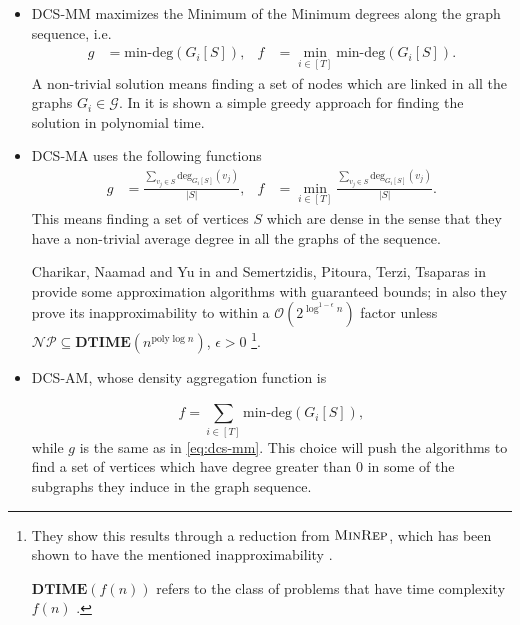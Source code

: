 \begin{itemize}
	\item \acrshort{DCS}-MM maximizes the Minimum of the Minimum degrees along
	      the graph sequence, i.e.
	      \begin{align}
		      \label{eq:dcs-mm}
		      g & = \text{min-deg} (G_i[S]), & f & = \min_{i \in [T]} \text{min-deg} (G_i[S]).
	      \end{align}
	      A non-trivial solution means finding a set of nodes which are linked
	      in all the graphs $G_i \in \mathcal{G} $.
	      In \cite{semertzidis2019finding} it is shown a simple greedy approach
	      for finding the solution in polynomial time.
	\item \acrshort{DCS}-MA uses the following functions
	      \begin{align}
		      \label{eq:dcs-ma}
		      g        & = \frac{\sum^{}_{v_{j} \in S } \text{deg}_{G_i[S]} (v_{j}
		      )}{|S|}, & f                                                         & = \min_{i \in [T]}
		      \frac{\sum^{}_{v_{j} \in S } \text{deg}_{G_i[S]} (v_{j} )}{|S|}.
	      \end{align}
	      This means finding a set of vertices $S$ which are dense in the sense
	      that they have a non-trivial average degree in all the graphs of the
	      sequence.


	      Charikar, Naamad and Yu in \cite{charikar2018finding} and
	      Semertzidis, Pitoura, Terzi, Tsaparas in
	      \cite{semertzidis2019finding} provide some
	      approximation algorithms with guaranteed bounds;
	      in \cite{charikar2018finding} also they prove its
	      inapproximability to within a $\mathcal{O}(2 ^{\log^{1-\epsilon} n} )
	      $ factor unless $\mathcal{NP} \subseteq \mathbf{DTIME} (n
		      ^{\text{poly}\log n} ) $, $\epsilon > 0$
	      \footnote{They show this results through a reduction from
	      $\textsc{MinRep}$, which has been shown to have the mentioned
	      inapproximability \cite{charikar2018finding,kortsarz2001hardness}.

	      $ \mathbf{DTIME}(f(n)) $ refers to the class of problems that
	      have time complexity $f(n)$ \cite{9780521884730}.
	      }.
	\item \acrshort{DCS}-AM, whose density aggregation function is

	      \begin{equation}
		      \label{eq:dcs-am}
		      f = \sum^{}_{i \in [T]} \text{min-deg} (G_i [S]),
	      \end{equation}
	      while $g$ is the same as in \eqref{eq:dcs-mm}. This choice will push
	      the algorithms to find a set of vertices which have degree greater
	      than $0$ in some of the subgraphs they induce in the graph sequence.


\end{itemize}
